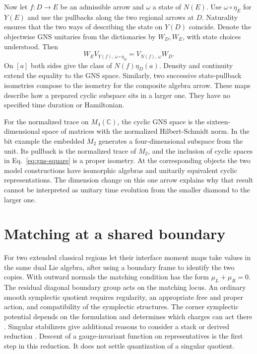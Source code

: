 \documentclass[11pt,letterpaper]{article}
\begin{document}
Now let \(f:D\to E\) be an admissible arrow and \(\omega\) a state of
\(N(E)\). Use \(\omega\circ\eta_E\) for \(Y(E)\) and use the pullbacks
along the two regional arrows at \(D\). Naturality ensures that the two
ways of describing the state on \(Y(D)\) coincide. Denote the
objectwise GNS unitaries from the dictionaries by \(W_D,W_E\), with
state choices understood. Then
\begin{equation}
 W_E V_{Y(f),\,\omega\circ\eta_E}
       =V_{N(f),\,\omega} W_D .
 \label{eq:gns-square}
\end{equation}
On \([a]\) both sides give the class of \(N(f)\eta_D(a)\). Density and
continuity extend the equality to the GNS space. Similarly, two
successive state-pullback isometries compose to the isometry for the
composite algebra arrow. These maps describe how a prepared cyclic
subspace sits in a larger one. They have no specified time duration or
Hamiltonian.

For the normalized trace on \(M_4(\mathbb C)\), the cyclic GNS space is
the sixteen-dimensional space of matrices with the normalized
Hilbert-Schmidt norm. In the bit example the embedded \(M_2\) generates
a four-dimensional subspace from the unit. Its pullback is the normalized
trace of \(M_2\), and the inclusion of cyclic spaces in
Eq.~\eqref{eq:gns-square} is a proper isometry. At the corresponding
objects the two model constructions have isomorphic algebras and
unitarily equivalent cyclic representations. The dimension change on
this one arrow explains why that result cannot be interpreted as unitary
time evolution from the smaller diamond to the larger one.

\section{Matching at a shared boundary}
For two extended classical regions let their interface moment maps take values in the same dual Lie algebra, after using a boundary frame to identify the two copies. With outward normals the matching condition has the form $\mu_L+\mu_R=0$. The residual diagonal boundary group acts on the matching locus. An ordinary smooth symplectic quotient requires regularity, an appropriate free and proper action, and compatibility of the symplectic structures. The corner symplectic potential depends on the formulation and determines which charges can act there \cite{corner}. Singular stabilizers give additional reasons to consider a stack or derived reduction \cite{df}. Descent of a gauge-invariant function on representatives is the first step in this reduction. It does not settle quantization of a singular quotient.
\end{document}
